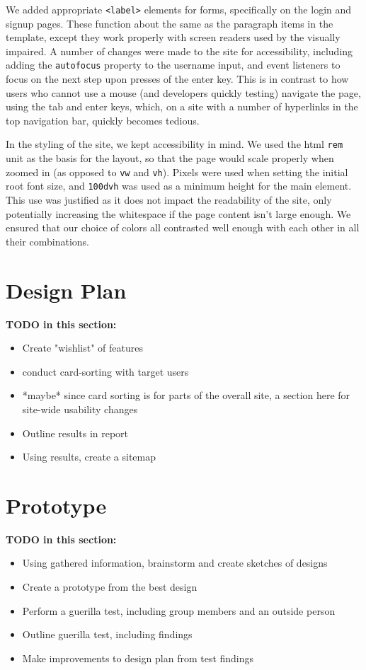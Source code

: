 \documentclass[12pt]{article}
\begin{document}
We added appropriate \texttt{<label>} elements for forms, specifically on the login and signup pages. These function about the same as the paragraph items in the template, except they work properly with screen readers used by the visually impaired. A number of changes were made to the site for accessibility, including adding the \texttt{autofocus} property to the username input, and event listeners to focus on the next step upon presses of the enter key. This is in contrast to how users who cannot use a mouse (and developers quickly testing) navigate the page, using the tab and enter keys, which, on a site with a number of hyperlinks in the top navigation bar, quickly becomes tedious.

In the styling of the site, we kept accessibility in mind. We used  the html \texttt{rem} unit as the basis for the layout, so that the page would scale properly when zoomed in (as opposed to \texttt{vw} and \texttt{vh}). Pixels were used when setting the initial root font size, and \texttt{100dvh} was used as a minimum height for the main element. This use was justified as it does not impact the readability of the site, only potentially increasing the whitespace if the page content isn't large enough. We ensured that our choice of colors all contrasted well enough with each other in all their combinations.

\section{Design Plan} %

\textbf{TODO in this section:}
\begin{itemize}
    \item Create "wishlist" of features
    \item conduct card-sorting with target users
    \item *maybe* since card sorting is for parts of the overall site, a section here for site-wide usability changes
    \item Outline results in report
    \item Using results, create a sitemap
\end{itemize}

\section[Prototype]{Prototype}

\textbf{TODO in this section:}
\begin{itemize}
    \item Using gathered information, brainstorm and create sketches of designs
    \item Create a prototype from the best design
    \item Perform a guerilla test, including group members and an outside person
    \item Outline guerilla test, including findings
    \item Make improvements to design plan from test findings
\end{itemize}
\end{document}
